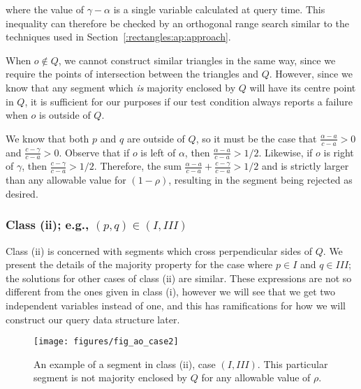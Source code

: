 \noindent where the value of $\gamma - \alpha$ is a single variable calculated at query time.  This inequality can therefore be checked by an orthogonal range search similar to the techniques used in Section~\ref{:rectangles:ap:approach}.

When $o \not \in Q$, we cannot construct similar triangles in the same way, since we require the points of intersection between the triangles and $Q$.  However, since we know that any segment which \emph{is} majority enclosed by $Q$ will have its centre point in $Q$, it is sufficient for our purposes if our test condition always reports a failure when $o$ is outside of $Q$.

We know that both $p$ and $q$ are outside of $Q$, so it must be the case that $\frac{\alpha - a}{c - a} > 0$ and $\frac{c - \gamma}{c - a} > 0$. Observe that if $o$ is left of $\alpha$, then $\frac{\alpha - a}{c - a} > 1/2$. Likewise, if $o$ is right of $\gamma$, then $\frac{c - \gamma}{c - a} > 1/2$. Therefore, the sum $\frac{\alpha - a}{c - a} + \frac{c - \gamma}{c - a} > 1/2$ and is strictly larger than any allowable value for $(1 - \rho)$, resulting in the segment being rejected as desired.


\subsubsection{Class (ii); e.g., $(p, q) \in (I, III)$}
\label{:rectanges:ao:class2}

Class (ii) is concerned with segments which cross perpendicular sides of $Q$. We present the details of the majority property for the case where $p \in I$ and $q \in III$; the solutions for other cases of class (ii) are similar. These expressions are not so different from the ones given in class (i), however we will see that we get two independent variables instead of one, and this has ramifications for how we will construct our query data structure later.

\begin{figure}[t]
\begin{center}
  \texttt{[image: figures/fig\_ao\_case2]}
  \caption[An example of a segment in class (ii), case $(I, III)$.]{An example of a segment in class (ii), case $(I, III)$. This particular segment is not majority enclosed by $Q$ for any allowable value of $\rho$.}
  \label{fig:rectangles:ao:case2}
\end{center}
\end{figure}


